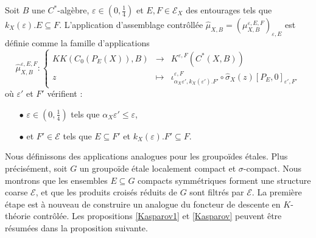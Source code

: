 \begin{definition}
Soit $B$ une $C^*$-algèbre, $\varepsilon\in (0,\frac{1}{4})$ et $E,F\in\mathcal E_X$ des entourages tels que $k_X(\varepsilon).E\subseteq F$. L'application d'assemblage contrôllée $\hat\mu_{X,B}=(\mu_{X,B}^{\varepsilon,E,F})_{\varepsilon,E}$ est définie comme la famille d'applications
\[\hat\mu_{X,B}^{\varepsilon, E,F} :\left\{\begin{array}{rcl} KK(C_0(P_E(X)),B) & \rightarrow & K^{\varepsilon, F}(C^*(X,B)) \\
					z & \mapsto & \iota_{\alpha_X \varepsilon',k_X(\varepsilon').F'}^{\varepsilon,F}\circ\hat\sigma_X(z)[P_{E},0]_{\varepsilon', F'}\end{array}\right.\]
où $\varepsilon'$ et $F'$ vérifient :
\begin{itemize}
\item[$\bullet$] $\varepsilon\in (0,\frac{1}{4})$ tels que $\alpha_X \varepsilon'\leq \varepsilon$,
\item[$\bullet$] et $F'\in\mathcal E$ tels que $E\subseteq F'$ et $k_X(\varepsilon).F'\subseteq F$.
\end{itemize}
\end{definition}

Nous définissons des applications analogues pour les groupoïdes étales. Plus précisément, soit $G$ un groupoïde étale localement compact et $\sigma$-compact. Nous montrons que les ensembles $E\subseteq G$ compacts symmétriques forment une structure coarse $\mathcal E$, et que les produits croisés réduits de $G$ sont filtrés par $\mathcal E$. La première étape est à nouveau de construire un analogue du foncteur de descente en $K$-théorie contrôlée. Les propositions \ref{Kasparov1} et \ref{Kasparov} peuvent être résumées dans la proposition suivante. 

